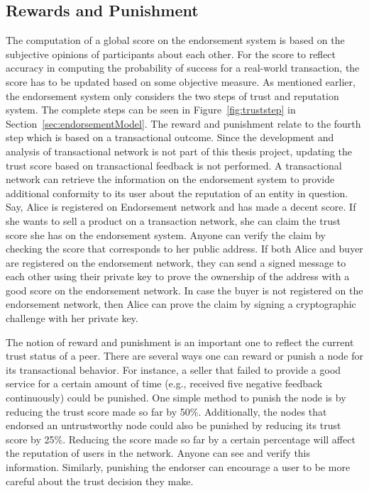 \subsection{Rewards and Punishment}\label{rewardpunishment} The computation of
a global score on the endorsement system is based on the subjective opinions of
participants about each other. For the score to reflect accuracy in computing
the probability of success for a real-world transaction, the score has to be
updated based on some objective measure. As mentioned earlier, the endorsement
system only considers the two steps of trust and reputation system. The
complete steps can be seen in Figure~\ref{fig:truststep} in
Section~\ref{sec:endorsementModel}. The reward and punishment relate to the
fourth step which is based on a transactional outcome. Since the development
and analysis of transactional network is not part of this thesis project,
updating the trust score based on transactional feedback is not performed. A
transactional network can retrieve the information on the endorsement system to
provide additional conformity to its user about the reputation of an entity in
question. Say, Alice is registered on Endorsement network and has made a decent
score. If she wants to sell a product on a transaction network, she can claim
the trust score she has on the endorsement system. Anyone can verify the claim
by checking the score that corresponds to her public address. If both Alice and
buyer are registered on the endorsement network, they can send a signed message
to each other using their private key to prove the ownership of the address
with a good score on the endorsement network. In case the buyer is not
registered on the endorsement network, then Alice can prove the claim by
signing a cryptographic challenge with her private key. \par 
The notion of reward and punishment is an important one to reflect the current
trust status of a peer. There are several ways one can reward or punish a node
for its transactional behavior. For instance, a seller that failed to provide a
good service for a certain amount of time (e.g., received five negative
feedback continuously) could be punished. One simple method to punish the node
is by reducing the trust score made so far by 50\%. Additionally, the nodes
that endorsed an untrustworthy node could also be punished by reducing its
trust score by 25\%. Reducing the score made so far by a certain percentage
will affect the reputation of users in the network. Anyone can see and verify
this information. Similarly, punishing the endorser can encourage a user to be
more careful about the trust decision they make.  

